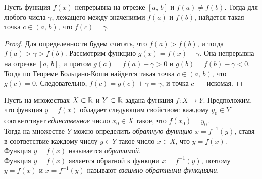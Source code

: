 \begin{theorem}
Пусть функция \(f(x)\) непрерывна на отрезке \([a, \, b]\) и \(f(a) \neq f(b)\).
Тогда для любого числа \(\gamma\), лежащего между значениями \(f(a)\) и \(f(b)\), найдется
такая точка \(c \in (a, \, b)\), что \(f(c) = \gamma\).

\begin{proof}
Для определенности будем считать, что \(f(a) > f(b)\), и тогда \(f(a) > \gamma > f(b)\).
Рассмотрим функцию \(g(x) = f(x) - \gamma\). Она непрерывна на отрезке \([a, \, b]\),
и притом \(g(a) = f(a) - \gamma > 0\) и \(g(b) = f(b) - \gamma < 0\).
Тогда по Теореме Больцано-Коши найдется такая точка \(c \in (a, \, b)\), что \(g(c) = 0\).
Следовательно, \(f(c) = g(c) + \gamma = \gamma\), и точка \(c\)~--- искомая.
\end{proof}
\end{theorem}



\begin{definition}
Пусть на множествах \(X \subset \mathbb{R}\) и \(Y \subset \mathbb{R}\) задана функция \(f:X \to Y\).
Предположим, что функция \(y = f(x)\) обладает следующим свойством:
каждому \(y_{0} \in Y\) соответствует \textit{единственное} число \(x_{0} \in X\) такое,
что \(f(x_{0}) = y_{0}.\) \\

Тогда на множестве \(Y\) можно определить \textit{обратную функцию} \(x = f^{-1} (y)\),
ставя в соответствие каждому числу \(y \in Y\) такое число \(x \in X\),
что \(y = f(x)\). \\

Функция \(y = f(x)\) называется \textit{обратимой}. \\
Функция \(y = f(x)\) является обратной к функции \(x = f^{-1} (y)\), поэтому
\(y = f(x)\) и \(x = f^{-1} (y)\) называют \textit{взаимно обратными функциями}.
\end{definition}

